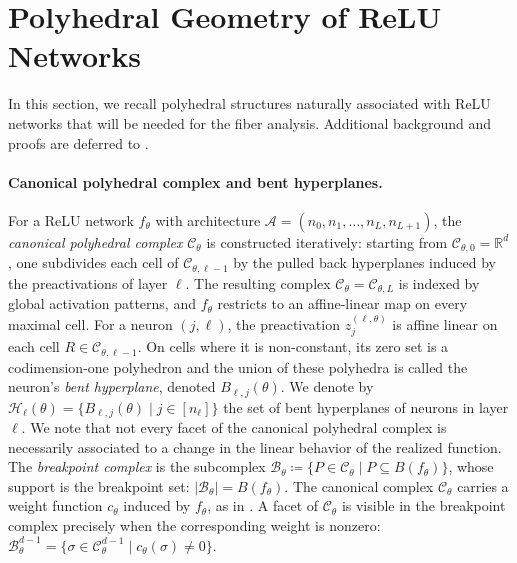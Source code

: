 \documentclass{article}
\theoremstyle{definition}
\newcommand{\R}{\mathbb{R}}
\newcommand{\architecture}{\mathcal{A}}
\newcommand{\complex}{\mathcal{C}}
\newcommand{\preactivation}[1]{z^{(#1)}}
\newcommand{\bhyperplane}[1]{B_{#1}}
\newcommand{\hyperplanes}[2]{\mathcal{H}_{#1}(#2)}
\newcommand{\breakpoints}[1]{B({#1})}
\newcommand{\bcomplex}[1]{\mathcal{B}_{#1}}
\begin{document}
\section{Polyhedral Geometry of ReLU Networks}
\label{sec:polyhedral_geometry_relu} 

In this section, we recall polyhedral structures naturally associated with ReLU networks that will be needed for the fiber analysis. 
Additional background and proofs are deferred to . 

\paragraph{Canonical polyhedral complex and bent hyperplanes.} 
For a ReLU network $f_\theta$ with architecture
$\architecture=(n_0,n_1,\dots,n_L,n_{L+1})
$, 
the \emph{canonical polyhedral complex} $\complex_\theta$ is constructed iteratively: 
starting from $\complex_{\theta,0}=\R^d$, one subdivides each cell of $\complex_{\theta,\ell-1}$ by the pulled back hyperplanes induced by the preactivations of layer $\ell$. 
The resulting complex $\complex_\theta=\complex_{\theta,L}$
is indexed by global activation patterns, and $f_\theta$ restricts to an affine-linear map on every maximal cell. 
For a neuron $(j,\ell)$, the preactivation $\preactivation{\ell,\theta}_j$ is affine linear on each cell $R\in\complex_{\theta,\ell-1}$. On cells where it is non-constant, its zero set is a codimension-one polyhedron and the union of these polyhedra is called the neuron's \emph{bent hyperplane}, denoted $B_{\ell,j}(\theta)$. 
%
We denote by
$
\hyperplanes{\ell}{\theta}
=
\{ \bhyperplane{\ell,j}(\theta) \mid j\in[n_\ell]\}
$ 
the set of bent hyperplanes of neurons in layer $\ell$. 
%
We note that not every facet of the canonical polyhedral complex is necessarily associated to a change in the linear behavior of the realized function. 
The \emph{breakpoint complex} is the subcomplex 
$\bcomplex{\theta}
\coloneqq
\{P\in \complex_\theta \mid P \subseteq \breakpoints{f_\theta}\}$, whose support is the breakpoint set: 
$|\bcomplex{\theta}|=\breakpoints{f_\theta}$. 
The canonical complex $\complex_\theta$ carries a weight function $c_\theta$ induced by $f_\theta$,
as in . 
A facet of $\complex_\theta$ is visible in the
breakpoint complex precisely when the corresponding weight is nonzero: 
$\bcomplex{\theta}^{d-1}
=
\{\sigma\in \complex_\theta^{d-1} \mid c_\theta(\sigma)\neq 0\}$. 
\end{document}
